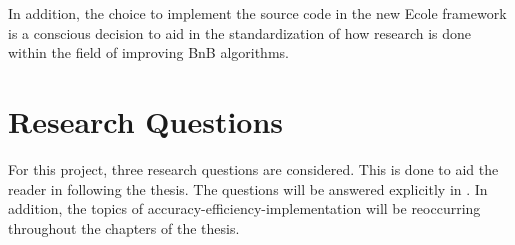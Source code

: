 In addition, the choice to implement the source code in the new \gls{Ecole} framework is a conscious decision to aid in the standardization of how research is done within the field of improving \gls{BnB} algorithms.  



\section{Research Questions}\label{sec:int_questions}

For this project, three research questions are considered. This is done to aid the reader in following the thesis. The questions will be answered explicitly in . In addition, the topics of accuracy-efficiency-implementation will be reoccurring throughout the chapters of the thesis. 

